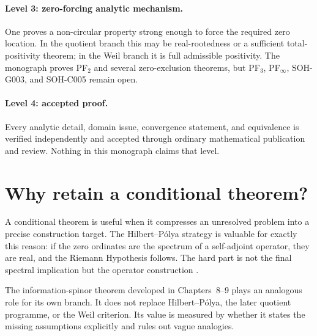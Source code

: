 \paragraph{Level 3: zero-forcing analytic mechanism.}
One proves a non-circular property strong enough to force the required zero location. In the quotient branch this may be real-rootedness or a sufficient total-positivity theorem; in the Weil branch it is full admissible positivity. The monograph proves PF$_2$ and several zero-exclusion theorems, but PF$_3$, PF$_\infty$, SOH-G003, and SOH-C005 remain open.

\paragraph{Level 4: accepted proof.}
Every analytic detail, domain issue, convergence statement, and equivalence is verified independently and accepted through ordinary mathematical publication and review. Nothing in this monograph claims that level.

\section{Why retain a conditional theorem?}

A conditional theorem is useful when it compresses an unresolved problem into a precise construction target. The Hilbert--P\'olya strategy is valuable for exactly this reason: if the zero ordinates are the spectrum of a self-adjoint operator, they are real, and the Riemann Hypothesis follows. The hard part is not the final spectral implication but the operator construction \citep{berrykeating1999,connes1999,dlmf2026}.

The information-spinor theorem developed in Chapters~8--9 plays an analogous role for its own branch. It does not replace Hilbert--P\'olya, the later quotient programme, or the Weil criterion. Its value is measured by whether it states the missing assumptions explicitly and rules out vague analogies.

